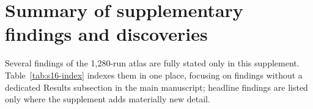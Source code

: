 \documentclass[pdflatex,sn-nature]{sn-jnl}%
\begin{document}

\section{Summary of supplementary findings and discoveries}\label{sec:s17-summary}

Several findings of the 1{,}280-run atlas are fully stated only in this supplement. Table~\ref{tab:s16-index} indexes them in one place, focusing on findings without a dedicated Results subsection in the main manuscript; headline findings are listed only where the supplement adds materially new detail.
\end{document}
